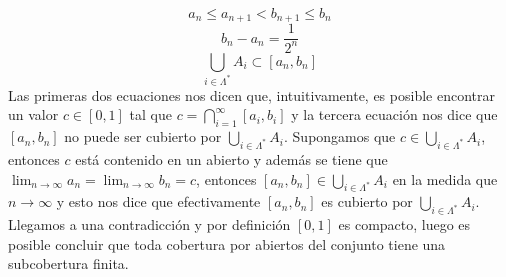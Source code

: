 \begin{ejemplo}
\begin{enumerate}
$$a_n \leq a_{n+1} < b_{n+1} \leq b_n$$
$$b_n - a_n = \frac{1}{2^n}$$
$$\bigcup_{i\in \Lambda^*} A_i \subset [a_n,b_n]$$
Las primeras dos ecuaciones nos dicen que, intuitivamente, es posible encontrar un valor $c\in [0,1]$ tal que $c=\bigcap_{i=1}^{\infty} [a_i,b_i]$ y la tercera ecuaci\'on nos dice que $[a_n,b_n]$ no puede ser cubierto por $\bigcup_{i\in \Lambda^*} A_i$. Supongamos que $c \in \bigcup_{i\in \Lambda^*} A_i$, entonces $c$ est\'a contenido en un abierto y adem\'as se tiene que $\lim_{n\to \infty} a_n = \lim_{n\to \infty} b_n = c$, entonces $[a_n,b_n] \in \bigcup_{i\in \Lambda^*} A_i$ en la medida que $n\to \infty$ y esto nos dice que efectivamente $[a_n,b_n]$ es cubierto por $\bigcup_{i\in \Lambda^*} A_i$. Llegamos a una contradicci\'on y por definici\'on $[0,1]$ es compacto, luego es posible concluir que toda cobertura por abiertos del conjunto tiene una subcobertura finita.
\end{enumerate} 
\end{ejemplo}




